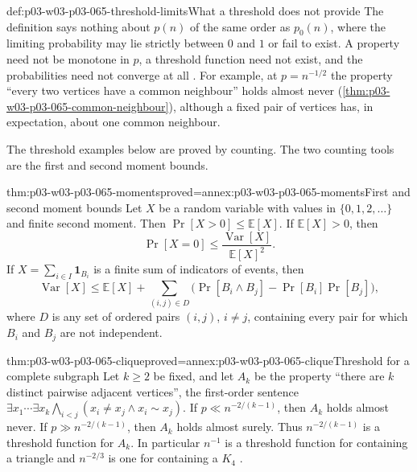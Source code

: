 \begin{hbwarning}{def:p03-w03-p03-065-threshold-limits}{What a threshold does not provide}
The definition says nothing about \(p(n)\) of the same order as \(p_0(n)\),
where the limiting probability may lie strictly between \(0\) and \(1\) or
fail to exist.  A property need not be monotone in \(p\), a threshold function
need not exist, and the probabilities need not converge at all
\cite[pp.~2--3]{Spencer2007LogicRandomStructuresAuthor}.  For example, at \(p=n^{-1/2}\) the
property ``every two vertices have a common neighbour'' holds almost never
(\cref{thm:p03-w03-p03-065-common-neighbour}), although a fixed pair of
vertices has, in expectation, about one common neighbour.
\end{hbwarning}

The threshold examples below are proved by counting.  The two counting tools
are the first and second moment bounds.

\begin{hblemma}{thm:p03-w03-p03-065-moments}{proved=annex:p03-w03-p03-065-moments}{First and second moment bounds}
Let \(X\) be a random variable with values in \(\{0,1,2,\ldots\}\) and finite
second moment.  Then \(\Pr[X>0]\leq\mathbb E[X]\).  If \(\mathbb E[X]>0\),
then
\[
  \Pr[X=0]\leq\frac{\operatorname{Var}[X]}{\mathbb E[X]^2}.
\]
If \(X=\sum_{i\in I}\mathbf 1_{B_i}\) is a finite sum of indicators of events,
then
\[
  \operatorname{Var}[X]\leq\mathbb E[X]
  +\sum_{(i,j)\in D}\bigl(\Pr[B_i\wedge B_j]-\Pr[B_i]\Pr[B_j]\bigr),
\]
where \(D\) is any set of ordered pairs \((i,j)\), \(i\neq j\), containing
every pair for which \(B_i\) and \(B_j\) are not independent.
\end{hblemma}

\begin{hbtheorem}{thm:p03-w03-p03-065-clique}{proved=annex:p03-w03-p03-065-clique}{Threshold for a complete subgraph}
Let \(k\geq2\) be fixed, and let \(A_k\) be the property ``there are \(k\)
distinct pairwise adjacent vertices'', the first-order sentence
\(\exists x_1\cdots\exists x_k\bigwedge_{i<j}(x_i\neq x_j\wedge x_i\sim x_j)\).
If \(p\ll n^{-2/(k-1)}\), then \(A_k\) holds almost never.  If
\(p\gg n^{-2/(k-1)}\), then \(A_k\) holds almost surely.  Thus
\(n^{-2/(k-1)}\) is a threshold function for \(A_k\).  In particular
\(n^{-1}\) is a threshold function for containing a triangle and
\(n^{-2/3}\) is one for containing a \(K_4\)
\cite[pp.~4--5]{Spencer2007LogicRandomStructuresAuthor}.
\end{hbtheorem}

